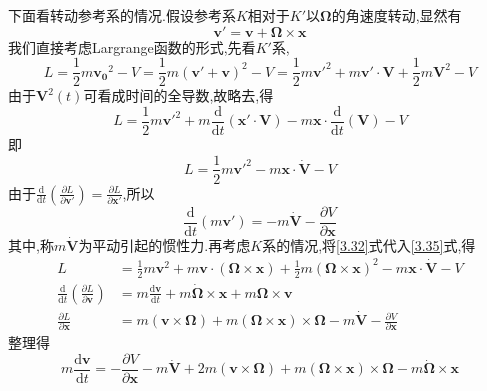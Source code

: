 下面看转动参考系的情况.假设参考系$K$相对于$K'$以$\boldsymbol{\Omega}$的角速度转动,显然有
\begin{equation}
\boldsymbol{v}' = \boldsymbol{v} + \boldsymbol{\Omega}\times\boldsymbol{x}
\label{3.32}
\end{equation}
我们直接考虑Largrange函数的形式,先看$K'$系,
\begin{equation}
L = \frac{1}{2}m\boldsymbol{v_0}^2 - V = \frac{1}{2}m(\boldsymbol{v'}+\boldsymbol{v})^2 - V
= \frac{1}{2}m\boldsymbol{v'}^2 + m\boldsymbol{v'}\cdot\boldsymbol{V} + \frac{1}{2}m\boldsymbol{V}^2 - V
\end{equation}
由于$\boldsymbol{V}^2(t)$可看成时间的全导数,故略去,得
\begin{equation}
L = \frac{1}{2}m\boldsymbol{v'}^2 + m\frac{\mathrm{d}}{\mathrm{d}t}(\boldsymbol{x'}\cdot\boldsymbol{V}) - m\boldsymbol{x}\cdot \frac{\mathrm{d}}{\mathrm{d}t}(\boldsymbol{V}) - V
\end{equation}
即
\begin{equation}
L = \frac{1}{2}m\boldsymbol{v'}^2 - m\boldsymbol{x}\cdot\boldsymbol{\dot{V}} - V
\label{3.35}
\end{equation}
由于$\frac{\mathrm{d}}{\mathrm{d}t}\left( \frac{\partial L}{\partial\boldsymbol{v'}} \right) = 
\frac{\partial L}{\partial \boldsymbol{x'}}$,所以
\begin{equation}
\frac{\mathrm{d}}{\mathrm{d}t}(m\boldsymbol{v'}) = -m\boldsymbol{\dot{V}} - 
\frac{\partial V}{\partial\boldsymbol{x}}
\end{equation}
其中,称$m\boldsymbol{\dot{V}}$为平动引起的惯性力.再考虑$K$系的情况,将\eqref{3.32}式代入\eqref{3.35}式,得
\begin{align}
L & = \frac{1}{2}m\boldsymbol{v}^2 + m\boldsymbol{v}\cdot(\boldsymbol{\Omega}\times\boldsymbol{x}) + \frac{1}{2}m(\boldsymbol{\Omega}\times\boldsymbol{x})^2 - m\boldsymbol{x}\cdot\boldsymbol{\dot{V}} - V \\
\frac{\mathrm{d}}{\mathrm{d}t}\left( \frac{\partial L}{\partial\boldsymbol{v}} \right) & = 
m\frac{\mathrm{d}\boldsymbol{v}}{\mathrm{d}t} + m\boldsymbol{\dot{\Omega}}\times\boldsymbol{x} + m\boldsymbol{\Omega}\times\boldsymbol{v} \\
\frac{\partial L}{\partial\boldsymbol{x}} & = m(\boldsymbol{v}\times\boldsymbol{\Omega}) + m(\boldsymbol{\Omega}\times\boldsymbol{x})\times\boldsymbol{\Omega} - m\boldsymbol{\dot{V}} - \frac{\partial V}{\partial\boldsymbol{x}}
\end{align}
整理得
\begin{equation}
m\frac{\mathrm{d}\boldsymbol{v}}{\mathrm{d}t} = -\frac{\partial V}{\partial\boldsymbol{x}} -m\boldsymbol{\dot{V}} + 
2m(\boldsymbol{v}\times\boldsymbol{\Omega}) + m(\boldsymbol{\Omega}\times\boldsymbol{x})\times\boldsymbol{\Omega} - m\boldsymbol{\dot{\Omega}}\times\boldsymbol{x}
\end{equation}
